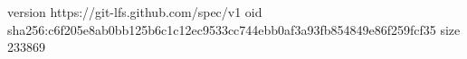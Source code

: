 version https://git-lfs.github.com/spec/v1
oid sha256:c6f205e8ab0bb125b6c1c12ec9533cc744ebb0af3a93fb854849e86f259fcf35
size 233869
